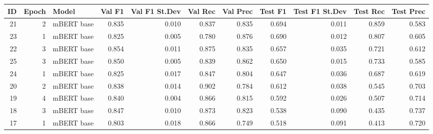 \begin{tabular}{rrlrrrrrrrr}
\toprule
 ID &  Epoch &      Model &  Val F1 &  Val F1 St.Dev &  Val Rec &  Val Prec &  Test F1 &  Test F1 St.Dev &  Test Rec &  Test Prec \\
\midrule
 21 &      2 & mBERT base &   0.835 &          0.010 &    0.837 &     0.835 &    0.694 &           0.011 &     0.859 &      0.583 \\
 23 &      1 & mBERT base &   0.825 &          0.005 &    0.780 &     0.876 &    0.690 &           0.012 &     0.807 &      0.605 \\
 22 &      3 & mBERT base &   0.854 &          0.011 &    0.875 &     0.835 &    0.657 &           0.035 &     0.721 &      0.612 \\
 25 &      3 & mBERT base &   0.850 &          0.005 &    0.839 &     0.862 &    0.650 &           0.015 &     0.733 &      0.585 \\
 24 &      1 & mBERT base &   0.825 &          0.017 &    0.847 &     0.804 &    0.647 &           0.036 &     0.687 &      0.619 \\
 20 &      2 & mBERT base &   0.838 &          0.014 &    0.902 &     0.784 &    0.612 &           0.038 &     0.545 &      0.703 \\
 19 &      4 & mBERT base &   0.840 &          0.004 &    0.866 &     0.815 &    0.592 &           0.026 &     0.507 &      0.714 \\
 18 &      3 & mBERT base &   0.847 &          0.010 &    0.873 &     0.823 &    0.538 &           0.090 &     0.435 &      0.737 \\
 17 &      1 & mBERT base &   0.803 &          0.018 &    0.866 &     0.749 &    0.518 &           0.091 &     0.413 &      0.720 \\
\bottomrule
\end{tabular}
